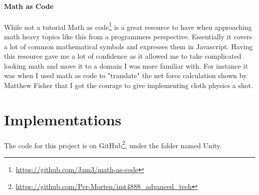 \paragraph{Math as Code}
While not a tutorial Math as code\footnote{\url{https://github.com/Jam3/math-as-code}} is a great resource to have when approaching math heavy topics like this from a programmers perspective.
Essentially it covers a lot of common mathematical symbols and expresses them in Javascript. 
Having this resource gave me a lot of confidence as it allowed me to take complicated looking math and move it to a domain I was more familiar with.
For instance it was when I used math as code to "translate" the net force calculation shown by Matthew Fisher\cite{matthew_fisher} that I got the courage to give implementing cloth physics a shot.

\section{Implementations}
The code for this project is on GitHub\footnote{\url{https://github.com/Per-Morten/imt4888_advanced_tech}}, under the folder named Unity.


